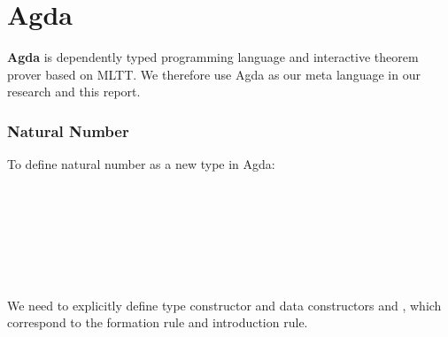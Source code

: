 \section{Agda}

\textbf{Agda} is dependently typed programming language and interactive theorem prover based on MLTT. We therefore use Agda as our meta language in our research and this report. 

\subsubsection*{Natural Number}

To define natural number  as a new type in Agda:

\begin{code}[hide]%
\>[0]\AgdaSymbol{\{-\#}\AgdaSpace{}%
\AgdaSpace{}%
\AgdaSpace{}%
\AgdaSymbol{\#-\}}\<%
\\
\>[0]\AgdaSpace{}%
\AgdaSpace{}%
\<%
\end{code}

\begin{code}%
\>[0]\<%
\\
\>[0]\AgdaSpace{}%
\AgdaSpace{}%
\AgdaSymbol{:}\AgdaSpace{}%
\AgdaSpace{}%
\<%
\\
\>[0][@{}l@{\AgdaIndent{0}}]%
\>[2]\<%
\\
%
\>[2]\AgdaSpace{}%
\AgdaSymbol{:}\AgdaSpace{}%
\<%
\\
%
\>[2]%
\>[7]\AgdaSymbol{:}\AgdaSpace{}%
\AgdaSpace{}%
\AgdaSpace{}%
\<%
\end{code}

We need to explicitly define type constructor  and data constructors  and , which correspond to the formation rule and introduction rule.

